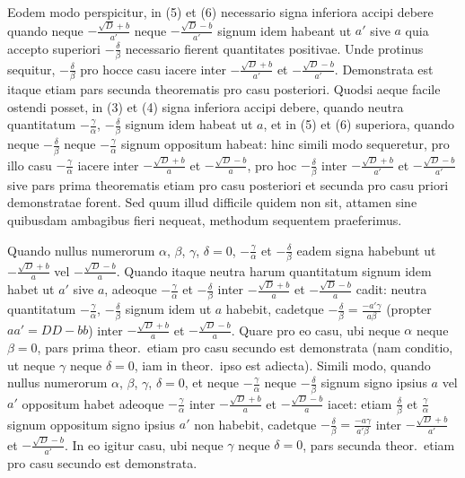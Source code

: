 \documentclass[12pt,a4paper]{article}
\theoremstyle{plain}
\begin{document}
Eodem modo perspicitur, in (5) et (6) necessario signa inferiora accipi debere quando neque $-\frac{\sqrt{D} + b}{a'}$ neque $-\frac{\sqrt{D} - b}{a'}$ signum idem habeant ut $a'$ sive $a$ quia accepto superiori $-\frac{\delta}{\beta}$ necessario fierent quantitates positivae. Unde protinus sequitur, $-\frac{\delta}{\beta}$ pro hocce casu iacere inter $-\frac{\sqrt{D} + b}{a'}$ et $-\frac{\sqrt{D} - b}{a'}$. Demonstrata est itaque etiam pars secunda theorematis pro casu posteriori. Quodsi aeque facile ostendi posset, in (3) et (4) signa inferiora accipi debere, quando neutra quantitatum $-\frac{\gamma}{\alpha}$, $-\frac{\delta}{\beta}$ signum idem habeat ut $a$, et in (5) et (6) superiora, quando neque $-\frac{\delta}{\beta}$ neque $-\frac{\gamma}{\alpha}$ signum oppositum habeat: hinc simili modo sequeretur, pro illo casu $-\frac{\gamma}{\alpha}$ iacere inter $-\frac{\sqrt{D} + b}{a}$ et $-\frac{\sqrt{D} - b}{a}$, pro hoc $-\frac{\delta}{\beta}$ inter $-\frac{\sqrt{D} + b}{a'}$ et $-\frac{\sqrt{D} - b}{a'}$ sive pars prima theorematis etiam pro casu posteriori et secunda pro casu priori demonstratae forent. Sed quum illud difficile quidem non sit, attamen sine quibusdam ambagibus fieri nequeat, methodum sequentem praeferimus.

Quando nullus numerorum $\alpha$, $\beta$, $\gamma$, $\delta = 0$, $-\frac{\gamma}{\alpha}$ et $-\frac{\delta}{\beta}$ eadem signa habebunt ut $-\frac{\sqrt{D} + b}{a}$ vel $-\frac{\sqrt{D} - b}{a}$. Quando itaque neutra harum quantitatum signum idem habet ut $a'$ sive $a$, adeoque $-\frac{\gamma}{\alpha}$ et $-\frac{\delta}{\beta}$ inter $-\frac{\sqrt{D} + b}{a}$ et $-\frac{\sqrt{D} - b}{a}$ cadit: neutra quantitatum $-\frac{\gamma}{\alpha}$, $-\frac{\delta}{\beta}$ signum idem ut $a$ habebit, cadetque $-\frac{\delta}{\beta} = \frac{-a'\gamma}{a\beta}$ (propter $aa' = DD - bb$) inter $-\frac{\sqrt{D} + b}{a}$ et $-\frac{\sqrt{D} - b}{a}$. Quare pro eo casu, ubi neque $\alpha$ neque $\beta = 0$, pars prima theor.~etiam pro casu secundo est demonstrata (nam conditio, ut neque $\gamma$ neque $\delta = 0$, iam in theor.~ipso est adiecta). Simili modo, quando nullus numerorum $\alpha$, $\beta$, $\gamma$, $\delta = 0$, et neque $-\frac{\gamma}{\alpha}$ neque $-\frac{\delta}{\beta}$ signum signo ipsius $a$ vel $a'$ oppositum habet adeoque $-\frac{\gamma}{\alpha}$ inter $-\frac{\sqrt{D} + b}{a}$ et $-\frac{\sqrt{D} - b}{a}$ iacet: etiam $\frac{\delta}{\beta}$ et $\frac{\gamma}{\alpha}$ signum oppositum signo ipsius $a'$ non habebit, cadetque $-\frac{\delta}{\beta} = \frac{-a\gamma}{a'\beta}$ inter $-\frac{\sqrt{D} + b}{a'}$ et $-\frac{\sqrt{D} - b}{a'}$. In eo igitur casu, ubi neque $\gamma$ neque $\delta = 0$, pars secunda theor.~etiam pro casu secundo est demonstrata.
\end{document}
